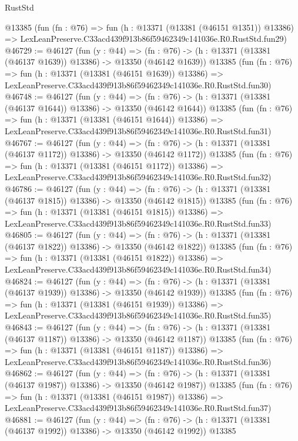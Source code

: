 \begin{lexlean}{RustStd}
\begin{coremodule}
    @13385
    (fun (fn : @76) =>
    fun (h : @13371 (@13381 (@46151 @1351)) @13386) =>
    LexLeanPreserve.C33acd439f913b86f59462349c141036e.R0.RustStd.fun29)
@46729 := @46127
    (fun (y : @44) =>
    (fn : @76) -> (h : @13371 (@13381 (@46137 @1639)) @13386) -> @13350 (@46142 @1639))
    @13385
    (fun (fn : @76) =>
    fun (h : @13371 (@13381 (@46151 @1639)) @13386) =>
    LexLeanPreserve.C33acd439f913b86f59462349c141036e.R0.RustStd.fun30)
@46748 := @46127
    (fun (y : @44) =>
    (fn : @76) -> (h : @13371 (@13381 (@46137 @1644)) @13386) -> @13350 (@46142 @1644))
    @13385
    (fun (fn : @76) =>
    fun (h : @13371 (@13381 (@46151 @1644)) @13386) =>
    LexLeanPreserve.C33acd439f913b86f59462349c141036e.R0.RustStd.fun31)
@46767 := @46127
    (fun (y : @44) =>
    (fn : @76) -> (h : @13371 (@13381 (@46137 @1172)) @13386) -> @13350 (@46142 @1172))
    @13385
    (fun (fn : @76) =>
    fun (h : @13371 (@13381 (@46151 @1172)) @13386) =>
    LexLeanPreserve.C33acd439f913b86f59462349c141036e.R0.RustStd.fun32)
@46786 := @46127
    (fun (y : @44) =>
    (fn : @76) -> (h : @13371 (@13381 (@46137 @1815)) @13386) -> @13350 (@46142 @1815))
    @13385
    (fun (fn : @76) =>
    fun (h : @13371 (@13381 (@46151 @1815)) @13386) =>
    LexLeanPreserve.C33acd439f913b86f59462349c141036e.R0.RustStd.fun33)
@46805 := @46127
    (fun (y : @44) =>
    (fn : @76) -> (h : @13371 (@13381 (@46137 @1822)) @13386) -> @13350 (@46142 @1822))
    @13385
    (fun (fn : @76) =>
    fun (h : @13371 (@13381 (@46151 @1822)) @13386) =>
    LexLeanPreserve.C33acd439f913b86f59462349c141036e.R0.RustStd.fun34)
@46824 := @46127
    (fun (y : @44) =>
    (fn : @76) -> (h : @13371 (@13381 (@46137 @1939)) @13386) -> @13350 (@46142 @1939))
    @13385
    (fun (fn : @76) =>
    fun (h : @13371 (@13381 (@46151 @1939)) @13386) =>
    LexLeanPreserve.C33acd439f913b86f59462349c141036e.R0.RustStd.fun35)
@46843 := @46127
    (fun (y : @44) =>
    (fn : @76) -> (h : @13371 (@13381 (@46137 @1187)) @13386) -> @13350 (@46142 @1187))
    @13385
    (fun (fn : @76) =>
    fun (h : @13371 (@13381 (@46151 @1187)) @13386) =>
    LexLeanPreserve.C33acd439f913b86f59462349c141036e.R0.RustStd.fun36)
@46862 := @46127
    (fun (y : @44) =>
    (fn : @76) -> (h : @13371 (@13381 (@46137 @1987)) @13386) -> @13350 (@46142 @1987))
    @13385
    (fun (fn : @76) =>
    fun (h : @13371 (@13381 (@46151 @1987)) @13386) =>
    LexLeanPreserve.C33acd439f913b86f59462349c141036e.R0.RustStd.fun37)
@46881 := @46127
    (fun (y : @44) =>
    (fn : @76) -> (h : @13371 (@13381 (@46137 @1992)) @13386) -> @13350 (@46142 @1992))
    @13385

\end{coremodule}
\end{lexlean}
